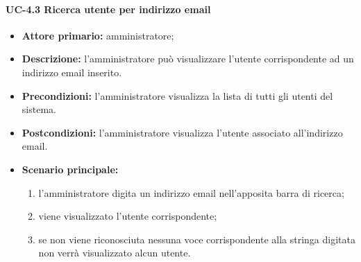     \paragraph{UC-4.3 Ricerca utente per indirizzo email}
    \begin{itemize}
        \item \textbf{Attore primario:} amministratore; 
    
        \item \textbf{Descrizione:} l'amministratore può visualizzare l'utente corrispondente ad un indirizzo email inserito.
    
        \item \textbf{Precondizioni:} l'amministratore visualizza la lista di tutti gli utenti del sistema.
    
        \item \textbf{Postcondizioni:} l'amministratore visualizza l'utente associato all'indirizzo email.
    
        \item \textbf{Scenario principale:}
              \begin{enumerate}
                  \item l'amministratore digita un indirizzo email nell'apposita barra di ricerca;
                  \item viene visualizzato l'utente corrispondente;
                  \item se non viene riconosciuta nessuna voce corrispondente alla stringa digitata non verrà visualizzato alcun utente.
              \end{enumerate}
    \end{itemize}

